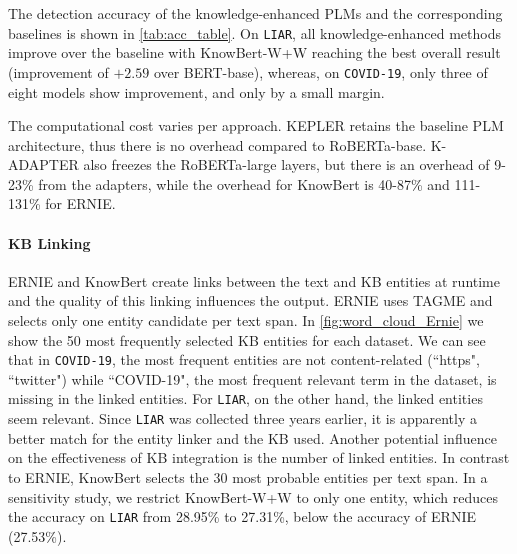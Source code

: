 \documentclass[letterpaper]{article} %
\begin{document}
The detection accuracy of the knowledge-enhanced PLMs and the corresponding baselines is shown in \autoref{tab:acc_table}. 
On \texttt{LIAR}, all knowledge-enhanced methods improve over the baseline with KnowBert-W+W reaching the best overall result (improvement of $+2.59$ over BERT-base), whereas, on \texttt{COVID-19}, only %
three of eight models show improvement, and only by a small margin.

The computational cost varies per approach. 
KEPLER retains the baseline PLM architecture, thus there is no overhead compared to RoBERTa-base.
K-ADAPTER also freezes the RoBERTa-large layers, but there is an overhead of 9-23\% from the adapters, while the overhead for KnowBert is 40-87\% and 111-131\% for ERNIE.

\paragraph{KB Linking}
ERNIE and KnowBert create links between the text and KB entities at runtime and the quality of this linking influences the output. 
ERNIE uses TAGME and selects only one entity candidate per text span. 
In \autoref{fig:word_cloud_Ernie} we show the 50  most frequently selected KB entities for each dataset.
We can see that in \texttt{COVID-19}, the most frequent entities are not content-related (``https", ``twitter") while ``COVID-19", the most frequent relevant term in the dataset, is missing in the linked entities. 
For \texttt{LIAR}, on the other hand, the linked entities seem relevant. 
Since \texttt{LIAR} was collected three years earlier, it is apparently a better match for the entity linker and the KB used.
%
Another potential influence on the effectiveness of KB integration is the number of linked entities.  
In contrast to ERNIE, KnowBert selects the 30 most probable entities per text span. 
In a sensitivity study, we restrict KnowBert-W+W to only one entity, which reduces the accuracy on \texttt{LIAR} from 28.95\% to 27.31\%, below the accuracy of ERNIE (27.53\%). 

 
 
 
\end{document}
